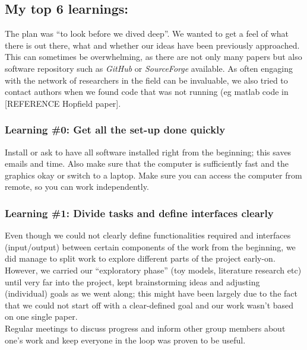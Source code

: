\documentclass[journal, a4paper]{IEEEtran}
\begin{document}
\subsection{My top 6 learnings:}

The plan was “to look before we dived deep”. We wanted to get a feel of what there is out there, what and whether our ideas have been previously approached. This can sometimes be overwhelming, as there are not only many papers but also software repository such as \textit{GitHub} or \textit{SourceForge} available. As often engaging with the network of researchers in the field can be invaluable, we also tried to contact authors when we found code that was not running (eg matlab code in [REFERENCE Hopfield paper].


\hfill
\subsubsection{Learning \#0: Get all the set-up done quickly}

Install or ask to have all software installed right from the beginning; this saves emails and time. Also make sure that the computer is sufficiently fast and the graphics okay or switch to a laptop. Make sure you can access the computer from remote, so you can work independently.

\hfill
\subsubsection{Learning \#1: Divide tasks and define interfaces clearly}
Even though we could not clearly define functionalities required and interfaces (input/output) between certain components of the work from the beginning, we did manage to split work to explore different parts of the project early-on. However, we carried our “exploratory phase” (toy models, literature research etc) until very far into the project, kept brainstorming ideas and adjusting (individual) goals as we went along; this might have been largely due to the fact that we could not start off with a clear-defined goal and our work wasn’t based on one single paper. \\
Regular meetings to discuss progress and inform other group members about one’s work and keep everyone in the loop was proven to be useful. 

\hfill
\end{document}
